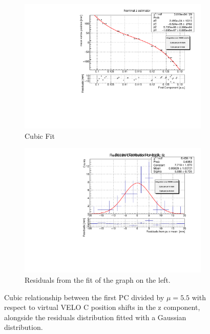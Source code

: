 \begin{figure}
    \centering
    \begin{subfigure}{0.48\textwidth}
    \includegraphics[width=\linewidth]{figures/z_fit_veloC_MC_residuals.pdf}
    \caption{Cubic Fit}\label{fig:z_veloC_fit_MC}
    \end{subfigure}
    \begin{subfigure}{0.48\textwidth}
    \includegraphics[width=\linewidth]{figures/z_res_veloC_MC_normalised.pdf}
    \caption{Residuals from the fit of the graph on the left. }\label{fig:z_veloC_res_MC}
    \end{subfigure}
    \caption{Cubic relationship between the first PC divided by $\mu=5.5$ with respect to virtual VELO C position shifts in the z component, alongside the residuals distribution fitted with a Gaussian distribution.}
    \label{fig:z_veloC_MC}
\end{figure}

